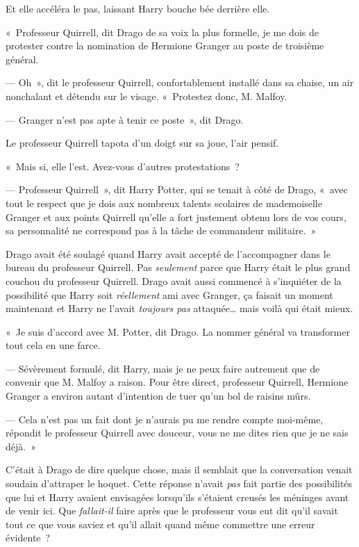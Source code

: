 Et elle accéléra le pas, laissant Harry bouche bée derrière elle.

\later

«~Professeur Quirrell, dit Drago de sa voix la plus formelle, je me dois de protester contre la nomination de Hermione Granger au poste de troisième général.

--- Oh~», dit le professeur Quirrell, confortablement installé dans sa chaise, un air nonchalant et détendu sur le visage. «~Protestez donc, M. Malfoy.

--- Granger n'est pas apte à tenir ce poste~», dit Drago.

Le professeur Quirrell tapota d'un doigt sur sa joue, l'air pensif.

«~Mais si, elle l'est. Avez-vous d'autres protestations~?

--- Professeur Quirrell~», dit Harry Potter, qui se tenait à côté de Drago, «~avec tout le respect que je dois aux nombreux talents scolaires de mademoiselle Granger et aux points Quirrell qu'elle a fort justement obtenu lors de vos cours, sa personnalité ne correspond pas à la tâche de commandeur militaire.~»

Drago avait été soulagé quand Harry avait accepté de l'accompagner dans le bureau du professeur Quirrell. Pas \emph{seulement} parce que Harry était le plus grand couchou du professeur Quirrell. Drago avait aussi commencé à s'inquiéter de la possibilité que Harry soit \emph{réellement} ami avec Granger, ça faisait un moment maintenant et Harry ne l'avait \emph{toujours pas} attaquée… mais voilà qui était mieux.

«~Je suis d'accord avec M. Potter, dit Drago. La nommer général va transformer tout cela en une farce.

--- Sévèrement formulé, dit Harry, mais je ne peux faire autrement que de convenir que M. Malfoy a raison. Pour être direct, professeur Quirrell, Hermione Granger a environ autant d'intention de tuer qu'un bol de raisins mûrs.

--- Cela n'est pas un fait dont je n'aurais pu me rendre compte moi-même, répondit le professeur Quirrell avec douceur, vous ne me dites rien que je ne sais déjà.~»

C'était à Drago de dire quelque chose, mais il semblait que la conversation venait soudain d'attraper le hoquet. Cette réponse n'avait \emph{pas} fait partie des possibilités que lui et Harry avaient envisagées lorsqu'ils s'étaient creusés les méninges avant de venir ici. Que \emph{fallait-il} faire après que le professeur vous eut dit qu'il savait tout ce que vous saviez et qu'il allait quand même commettre une erreur évidente~?

